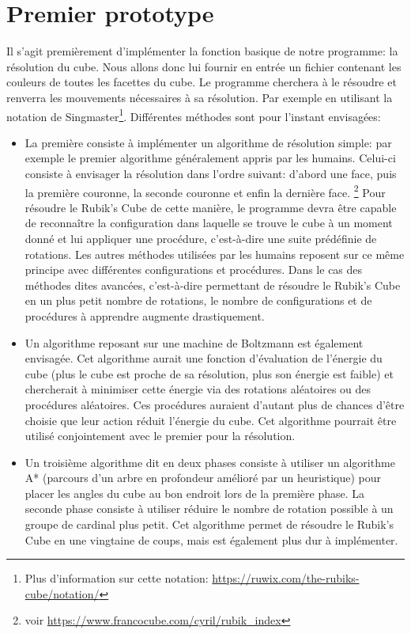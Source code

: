 \documentclass[a4paper]{report}
\begin{document}
\section{Premier prototype}
Il s'agit premièrement d'implémenter la fonction basique de notre programme: la résolution du cube. Nous allons donc lui fournir en entrée un fichier contenant les couleurs de toutes les facettes du cube. Le programme cherchera à le résoudre et renverra les mouvements nécessaires à sa résolution. Par exemple en utilisant la notation de Singmaster\footnote{Plus d'information sur cette notation: \url{https://ruwix.com/the-rubiks-cube/notation/}}.
Différentes méthodes sont pour l'instant envisagées:
\begin{itemize}
    \item La première consiste à implémenter un algorithme de résolution simple: par exemple le premier algorithme généralement appris par les humains. Celui-ci consiste à envisager la résolution dans l'ordre suivant: d'abord une face, puis la première couronne, la seconde couronne et enfin la dernière face. \footnote {voir \url{https://www.francocube.com/cyril/rubik_index}} Pour résoudre le Rubik's Cube de cette manière, le programme devra être capable de reconnaître la configuration dans laquelle se trouve le cube à un moment donné et lui
    appliquer une procédure, c'est-à-dire une suite prédéfinie de rotations. Les autres méthodes utilisées par les humains reposent sur ce même principe avec différentes configurations et procédures. Dans le cas des méthodes dites avancées, c'est-à-dire permettant de résoudre le Rubik's Cube en un plus petit nombre de rotations, le nombre de configurations et de procédures à apprendre augmente drastiquement.
    \item Un algorithme reposant sur une machine de Boltzmann est également envisagée. Cet algorithme aurait une fonction d'évaluation de l'énergie du cube (plus le cube est proche de sa résolution, plus son énergie est faible) et chercherait à minimiser cette énergie via des rotations aléatoires ou des procédures aléatoires. Ces procédures auraient d'autant plus de chances d'être choisie que leur action réduit l'énergie du cube. Cet algorithme pourrait être utilisé conjointement avec le premier pour la résolution.
    \item Un troisième algorithme dit en deux phases consiste à utiliser un algorithme A* (parcours d'un arbre en profondeur amélioré par un heuristique) pour placer les angles du cube au bon endroit lors de la première phase. La seconde phase consiste à utiliser réduire le nombre de rotation possible à un groupe de cardinal plus petit. Cet algorithme permet de résoudre le Rubik's Cube en une vingtaine de coups, mais est également plus dur à implémenter.
\end{itemize}
\end{document}
